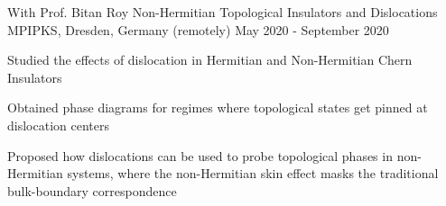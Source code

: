 \begin{cventries}
\cventry
{With Prof. Bitan Roy} %
{Non-Hermitian Topological Insulators and Dislocations} %
{MPIPKS, Dresden, Germany (remotely)} %
{May 2020 - September 2020} %
{
	\begin{cvitems} %
		\item {Studied the effects of dislocation in Hermitian and Non-Hermitian Chern Insulators}
		\item {Obtained phase diagrams for regimes where topological states get pinned at dislocation centers}
		\item {Proposed how dislocations can be used to probe topological phases in non-Hermitian systems, where the non-Hermitian skin effect masks the traditional bulk-boundary correspondence}
	\end{cvitems}
}



\end{cventries}
